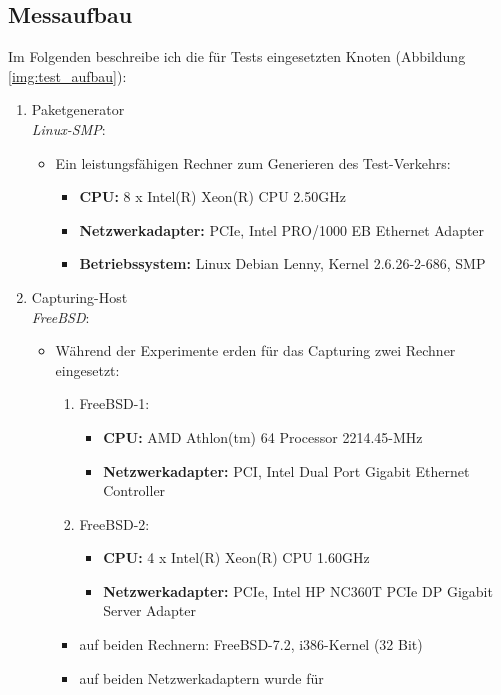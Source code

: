 \subsection{Messaufbau}\label{sec:messaufbau}
Im Folgenden beschreibe ich die für Tests eingesetzten Knoten (Abbildung
\ref{img:test_aufbau}): 
\begin{enumerate}
	\item Paketgenerator \\ \emph{Linux-SMP}:
		\begin{itemize}
			\item Ein leistungsfähigen Rechner zum Generieren des Test-Verkehrs:
				\begin{itemize}
					\item \textbf{CPU:} 8 x Intel(R) Xeon(R) CPU 2.50GHz
					\item \textbf{Netzwerkadapter:} PCIe, Intel PRO/1000 EB Ethernet Adapter
					\item \textbf{Betriebssystem:} Linux Debian Lenny, Kernel 2.6.26-2-686, SMP
				\end{itemize}
		\end{itemize}
	\item Capturing-Host \\ \emph{FreeBSD}: 
		\begin{itemize}
			\item Während der Experimente erden für das Capturing zwei Rechner eingesetzt: 
				\begin{enumerate}
					\item FreeBSD-1:
						\begin{itemize}
							\item \textbf{CPU:} AMD Athlon(tm) 64 Processor 2214.45-MHz
							\item \textbf{Netzwerkadapter:} PCI, Intel Dual Port Gigabit Ethernet Controller
						\end{itemize}
					\item FreeBSD-2:
						\begin{itemize}
							\item \textbf{CPU:} 4 x Intel(R) Xeon(R) CPU 1.60GHz
							\item \textbf{Netzwerkadapter:} PCIe, Intel HP NC360T PCIe DP Gigabit Server Adapter	 
						\end{itemize}
				\end{enumerate}
				\begin{itemize}
					\item auf beiden Rechnern: FreeBSD-7.2, i386-Kernel (32 Bit)
					\item auf beiden Netzwerkadaptern wurde für

\end{itemize}
\end{itemize}
\end{enumerate}
